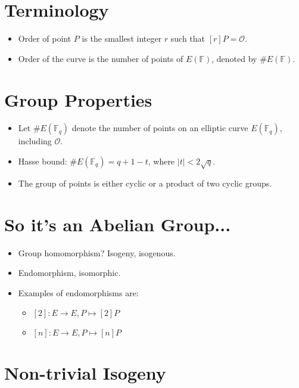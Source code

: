 \section*{Terminology}

\begin{itemize}
	\item Order of point \( P \) is the smallest integer \( r \) such that \( [r]P = \mathcal{O} \).
	\item Order of the curve is the number of points of \( E(\mathbb{F}) \), denoted by \( \#E(\mathbb{F}) \).
\end{itemize}

\section*{Group Properties}

\begin{itemize}
	\item Let \( \#E(\mathbb{F}_q) \) denote the number of points on an elliptic curve \( E(\mathbb{F}_q) \), including \( \mathcal{O} \).
	\item Hasse bound: \( \#E(\mathbb{F}_q) = q + 1 - t \), where \( |t| < 2 \sqrt{q} \).
	\item The group of points is either cyclic or a product of two cyclic groups.
\end{itemize}

\section*{So it's an Abelian Group...}

\begin{itemize}
	\item Group homomorphism? Isogeny, isogenous.
	\item Endomorphism, isomorphic.
	\item Examples of endomorphisms are:
	\begin{itemize}
		\item \( [2]: E \to E, P \mapsto [2]P \)
		\item \( [n]: E \to E, P \mapsto [n]P \)
	\end{itemize}
\end{itemize}

\section*{Non-trivial Isogeny}

